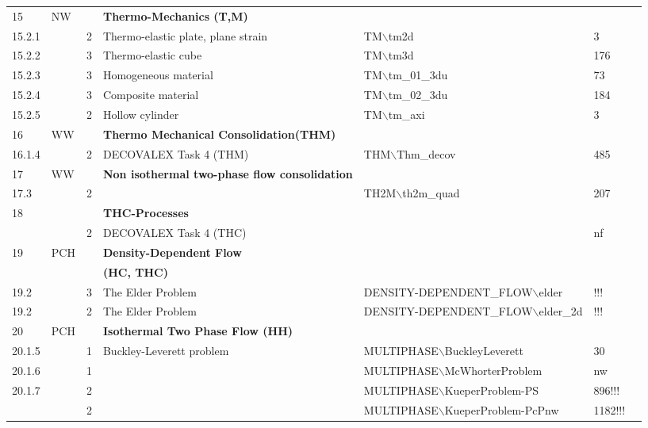 \begin{landscape}
\begin{center}
\begin{tabularx}{\linewidth}{lllXXll}
15&NW&& \textbf{Thermo-Mechanics (T,M)}&&&\\
15.2.1&&                2&      Thermo-elastic plate, plane strain&     TM$\backslash$tm2d&3&\\
15.2.2&&                3&      Thermo-elastic cube&    TM$\backslash$tm3d&176&\\
15.2.3&&                3&      Homogeneous material&   TM$\backslash$tm\_01\_3du&73&\\
15.2.4&&                3&      Composite material&     TM$\backslash$tm\_02\_3du&184&\\
15.2.5&&                2&      Hollow cylinder&        TM$\backslash$tm\_axi&3&\\
\midrule

16&WW&& \textbf{Thermo Mechanical Consolidation(THM) }&&&\\
16.1.4&&                2&      DECOVALEX Task 4 (THM)& THM$\backslash$Thm\_decov&485&\\
\midrule
17&WW&&\textbf{Non isothermal two-phase flow consolidation}     &&&\\
17.3    &&      2&&             TH2M$\backslash$th2m\_quad&207&\\
\midrule

18&&&   \textbf{THC-Processes}&&&\\
&&      2&      DECOVALEX Task 4 (THC)&& nf&\\
\midrule

19&PCH&&        \textbf{Density-Dependent Flow }&&&\\
&&&\textbf{(HC, THC)}&&&\\
19.2&&          3&      The Elder Problem&      DENSITY-DEPENDENT\_FLOW$\backslash$elder&!!!&\\
19.2&&          2&      The Elder Problem&      DENSITY-DEPENDENT\_FLOW$\backslash$elder\_2d&!!!&\\
\midrule

20&PCH&&        \textbf{Isothermal Two Phase Flow (HH)}&&&\\
20.1.5  &&1&    Buckley-Leverett problem&       MULTIPHASE$\backslash$BuckleyLeverett&30&\\
20.1.6  &&1&&     MULTIPHASE$\backslash$McWhorterProblem&nw&\\
20.1.7  &&2&&           MULTIPHASE$\backslash$KueperProblem-PS&896!!!&\\
                                &&2&&           MULTIPHASE$\backslash$KueperProblem-PcPnw&1182!!!&\\
        

\end{tabularx}
\end{center}
\end{landscape}
